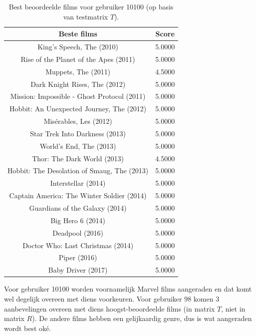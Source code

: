 \begin{table}[H]
\centering
\begin{tabular}{c|c}
\textbf{Beste films} & \textbf{Score} \\
\hline
King's Speech, The (2010) &                   5.0000 \\
Rise of the Planet of the Apes (2011) &       5.0000 \\
Muppets, The (2011) &                         4.5000 \\
Dark Knight Rises, The (2012) &               5.0000 \\
Mission: Impossible - Ghost Protocol (2011) & 5.0000 \\
Hobbit: An Unexpected Journey, The (2012) &   5.0000 \\
Mis\'erables, Les (2012) &                      5.0000 \\
Star Trek Into Darkness (2013) &              5.0000 \\
World's End, The (2013) &                     5.0000 \\
Thor: The Dark World (2013) &                 4.5000 \\
Hobbit: The Desolation of Smaug, The (2013) & 5.0000 \\
Interstellar (2014) &                         5.0000 \\
Captain America: The Winter Soldier (2014) &  5.0000 \\
Guardians of the Galaxy (2014) &              5.0000 \\
Big Hero 6 (2014) &                           5.0000 \\
Deadpool (2016) &                             5.0000 \\
Doctor Who: Last Christmas (2014) &           5.0000 \\
Piper (2016) &                                5.0000 \\
Baby Driver (2017) &                          5.0000 
\end{tabular}
\caption{Best beoordeelde films voor gebruiker 10100 (op basis van testmatrix $T$).}
\label{fig:op18d}
\end{table}

\noindent Voor gebruiker 10100 worden voornamelijk Marvel films aangeraden en dat komt wel degelijk overeen met  diens voorkeuren. Voor gebruiker 98 komen 3 aanbevelingen overeen met diens hoogst-beoordeelde films (in matrix $T$, niet in matrix $R$). De andere films hebben een gelijkaardig genre, dus is wat aangeraden wordt best ok\'e.\\


